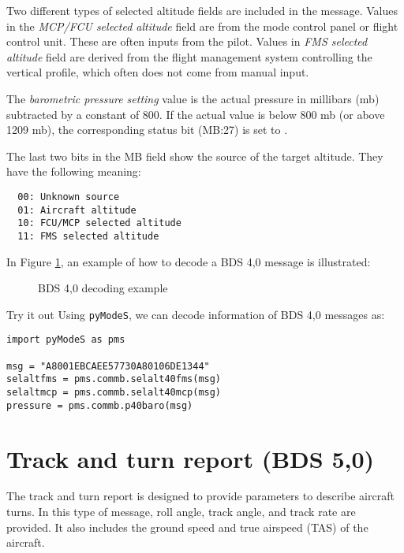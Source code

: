 Two different types of selected altitude fields are included in the message. Values in the \emph{MCP/FCU selected altitude} field are from the mode control panel or flight control unit. These are often inputs from the pilot. Values in \emph{FMS selected altitude} field are derived from the flight management system controlling the vertical profile, which often does not come from manual input.

The \emph{barometric pressure setting} value is the actual pressure in millibars (mb) subtracted by a constant of 800. If the actual value is below 800 mb (or above 1209 mb), the corresponding status bit (MB:27) is set to \0.

The last two bits in the MB field show the source of the target altitude. They have the following meaning:

\begin{verbatim}
  00: Unknown source
  01: Aircraft altitude
  10: FCU/MCP selected altitude
  11: FMS selected altitude
\end{verbatim}


In Figure \ref{fig:bds40_example}, an example of how to decode a BDS 4,0 message is illustrated:

\begin{figure}[ht]
  \centering
  
  \vspace{0.2cm}
  \caption{BDS 4,0 decoding example}
  \label{fig:bds40_example}
\end{figure}

\begin{notebox}{Try it out}
Using \texttt{pyModeS}, we can decode information of BDS 4,0 messages as: 

\begin{verbatim}
import pyModeS as pms

msg = "A8001EBCAEE57730A80106DE1344"
selaltfms = pms.commb.selalt40fms(msg)
selaltmcp = pms.commb.selalt40mcp(msg)
pressure = pms.commb.p40baro(msg)
\end{verbatim}

\end{notebox}



\clearpage

\section{Track and turn report (BDS 5,0)}

The track and turn report is designed to provide parameters to describe aircraft turns. In this type of message, roll angle, track angle, and track rate are provided. It also includes the ground speed and true airspeed (TAS) of the aircraft.

